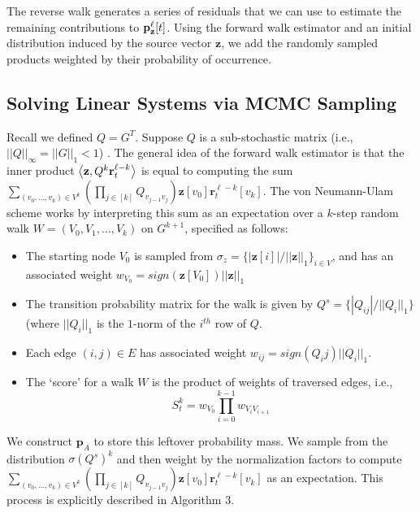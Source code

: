 The reverse walk generates a series of residuals that we can use to estimate the remaining contributions to ${\mathbf{p}}_\mathbf{z}^{\ell}[t]$. Using the forward walk estimator and an initial distribution induced by the source vector $\mathbf{z}$, we add the randomly sampled products weighted by their probability of occurrence.

\subsection{Solving Linear Systems via MCMC Sampling}
\label{ssec:forwardwork}

Recall we defined $Q = G^T$. Suppose $Q$ is a sub-stochastic matrix (i.e., $||Q||_{\infty} = ||G||_{1} < 1$) .
The general idea of the forward walk estimator is that the inner product $\left< \mathbf{z}, Q^k\mathbf{r}^{\ell-k}_t \right>$ is equal to computing the sum $\sum_{(v_0,\ldots, v_k) \in V^k}\left(\prod_{j \in [k]} Q_{v_{j-1}v_{j}} \right) \mathbf{z}[v_0] \mathbf{r}_t^{\ell-k}[v_k]$. 
The von Neumann-Ulam scheme works by interpreting this sum as an expectation over a $k$-step random walk $W = (V_0,V_1,\ldots,V_k)$ on $G^{k+1}$, specified as follows:
\begin{itemize}[nosep,leftmargin=*]
\item The starting node $V_0$ is sampled from $\sigma_z = \{|\mathbf{z}[i]|/||\mathbf{z}||_1\}_{i\in V}$, and has an associated weight $w_{V_0} = sign(\mathbf{z}[V_0])||\mathbf{z}||_1$
\item The transition probability matrix for the walk is given by $Q^s = \{|Q_{ij}|/||Q_i||_1\}$ (where $||Q_i||_1$ is the $1$-norm of the $i^{th}$ row of $Q$.
\item Each edge $(i,j)\in E$ has associated weight $w_{ij} = sign(Q_ij)||Q_i||_1$. 
\item The `score' for a walk $W$ is the product of weights of traversed edges, i.e.,
$$S_t^k = w_{V_0}\prod_{i=0}^{k-1}w_{V_iV_{i+1}} $$
\end{itemize}
We construct $\mathbf{p}_A$ to store this leftover probability mass. 
We sample from the distribution $\sigma (Q^s)^k$ and then weight by the normalization factors to compute $\sum_{(v_0,\ldots, v_k) \in V^k}\left(\prod_{j \in [k]} Q_{v_{j-1}v_{j}} \right) \mathbf{z}[v_0] \mathbf{r}_t^{\ell-k}[v_k]$ as an expectation. 
This process is explicitly described in Algorithm 3.

